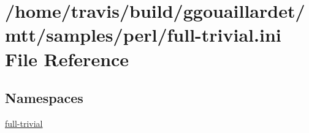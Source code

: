 \hypertarget{full-trivial_8ini}{\section{/home/travis/build/ggouaillardet/mtt/samples/perl/full-\/trivial.ini File Reference}
\label{full-trivial_8ini}
}
\subsection*{Namespaces}
\begin{DoxyCompactItemize}
\item 
\hyperlink{namespacefull-trivial}{full-\/trivial}
\end{DoxyCompactItemize}
